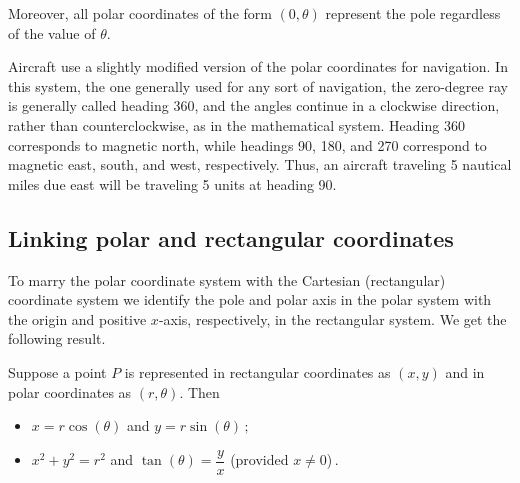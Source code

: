 Moreover, all polar coordinates of the form $(0, \theta)$ represent the pole regardless of the value of $\theta$.

\begin{remark}
Aircraft use a slightly modified version of the polar coordinates for navigation. In this system, the one generally used for any sort of navigation, the zero-degree ray is generally called heading 360, and the angles continue in a clockwise direction, rather than counterclockwise, as in the mathematical system. Heading 360 corresponds to magnetic north, while headings 90, 180, and 270 correspond to magnetic east, south, and west, respectively. Thus, an aircraft traveling 5 nautical miles due east will be traveling 5 units at heading 90.
\end{remark}


\subsection{Linking polar and rectangular coordinates}
To marry the polar coordinate system with the Cartesian (rectangular) coordinate system we identify the pole and polar axis in the polar system with the origin and positive $x$-axis, respectively, in the rectangular system.  We get the following result.



\begin{theorem} \label{polarrectangularconversion} 
Suppose a point $P$ is represented in rectangular coordinates as $(x,y)$ and in polar coordinates as $(r,\theta)$.  Then

\begin{itemize}

\item $x = r \cos(\theta)$ and $y = r\sin(\theta)\,;$ 

\item $x^2+y^2 = r^2$ and $\tan(\theta) = \dfrac{y}{x}$ (provided $x \neq 0$)\,. 

\end{itemize}

\end{theorem}


